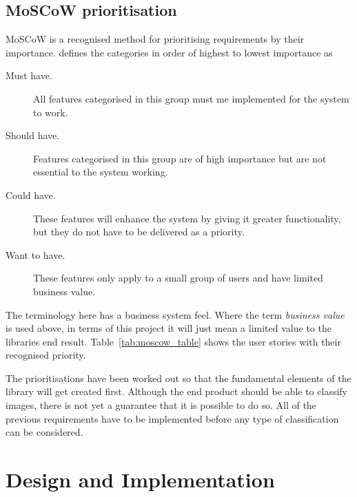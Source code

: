 \documentclass[11pt,oneside]{report}
\begin{document}
		\section{MoSCoW prioritisation}
			MoSCoW is a recognised method for prioritising requirements by their importance.  defines the categories in order of highest to lowest importance as
			\begin{description}
				\item[Must have. ] All features categorised in this group must me implemented for the system to work.
				\item[Should have. ] Features categorised in this group are of high importance but are not essential to the system working.
				\item[Could have. ] These features will enhance the system by giving it greater functionality, but they do not have to be delivered as a priority.
				\item[Want to have. ] These features only apply to a small group of users and have limited business value.
			\end{description}
			The terminology here has a business system feel.
			Where the term \textit{business value} is used above, in terms of this project it will just mean a limited value to the libraries end result.
			Table~\ref{tab:moscow_table} shows the user stories with their recognised priority.
			
			\clearpage
			The prioritisations have been worked out so that the fundamental elements of the library will get created first.
			Although the end product should be able to classify images, there is not yet a guarantee that it is possible to do so.
			All of the previous requirements have to be implemented before any type of classification can be considered.

    		
	
	\chapter{Design and Implementation}\label{chap:des&imp}
\end{document}
